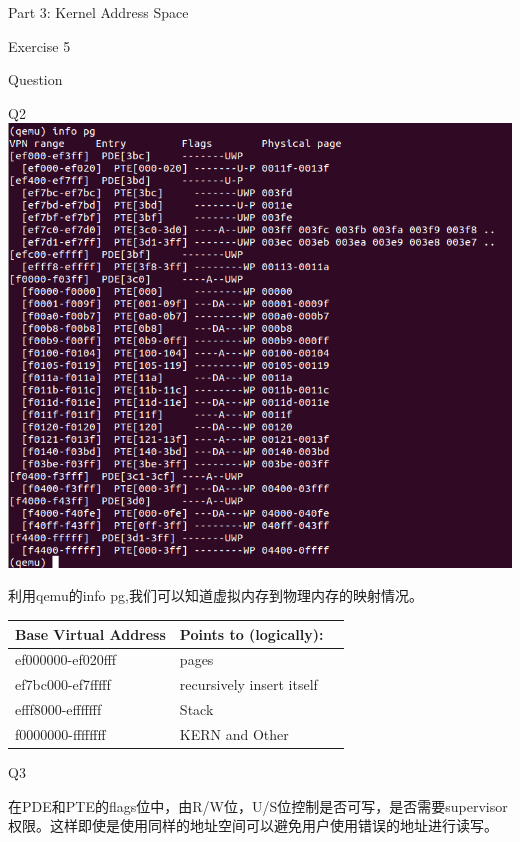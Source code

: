 \documentclass[GBK,winfonts,a4paper,10pt]{ctexart}
\begin{document}
\begin{section}{Part 3: Kernel Address Space}
\begin{subsection}{Exercise 5}
\end{subsection}

\begin{subsection}{Question}
\begin{subsubsection}{Q2}
\includegraphics[scale=0.5]{Ex5infopg.png}
\par
利用qemu的info pg,我们可以知道虚拟内存到物理内存的映射情况。
\begin{center}
    \begin{tabular}{ | l | l | l |}
    \hline
           Base Virtual Address & Points to (logically): 	\\ \hline
           ef000000-ef020fff   &  pages 						\\ \hline
           ef7bc000-ef7fffff   &  recursively insert itself     \\ \hline
           efff8000-efffffff   &  Stack 							\\ \hline
           f0000000-ffffffff   &  KERN and Other \\   
    \hline
    \end{tabular}
\end{center}
\end{subsubsection}

\begin{subsubsection}{Q3}
\par
在PDE和PTE的flags位中，由R/W位，U/S位控制是否可写，是否需要supervisor权限。这样即使是使用同样的地址空间可以避免用户使用错误的地址进行读写。
\end{subsubsection}


\end{subsection}
\end{section}
\end{document}
